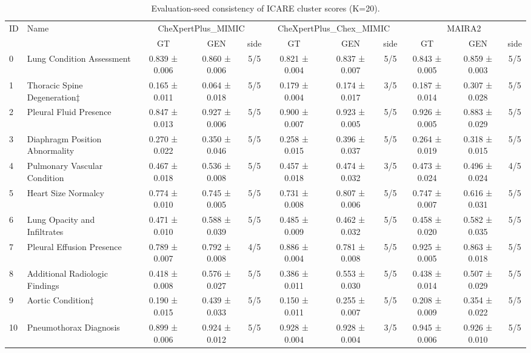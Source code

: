 \begin{table}[t]
\centering
\small
\caption{Evaluation-seed consistency of ICARE cluster scores (K=20).}
\label{tab:supp_exp5}
\begin{tabular}{llccccccccc}
\toprule
ID & Name & \multicolumn{3}{c}{CheXpertPlus\_MIMIC} & \multicolumn{3}{c}{CheXpertPlus\_Chex\_MIMIC} & \multicolumn{3}{c}{MAIRA2} \\
\cmidrule(lr){3-5}\cmidrule(lr){6-8}\cmidrule(lr){9-11}
 & & GT & GEN & side & GT & GEN & side & GT & GEN & side \\
\midrule
0 & Lung Condition Assessment & 0.839 ± 0.006 & 0.860 ± 0.006 & 5/5 & 0.821 ± 0.004 & 0.837 ± 0.007 & 5/5 & 0.843 ± 0.005 & 0.859 ± 0.003 & 5/5 \\
1 & Thoracic Spine Degeneration‡ & 0.165 ± 0.011 & 0.064 ± 0.018 & 5/5 & 0.179 ± 0.004 & 0.174 ± 0.017 & 3/5 & 0.187 ± 0.014 & 0.307 ± 0.028 & 5/5 \\
2 & Pleural Fluid Presence & 0.847 ± 0.013 & 0.927 ± 0.006 & 5/5 & 0.900 ± 0.007 & 0.923 ± 0.005 & 5/5 & 0.926 ± 0.005 & 0.883 ± 0.029 & 5/5 \\
3 & Diaphragm Position Abnormality & 0.270 ± 0.022 & 0.350 ± 0.046 & 5/5 & 0.258 ± 0.015 & 0.396 ± 0.037 & 5/5 & 0.264 ± 0.019 & 0.318 ± 0.015 & 5/5 \\
4 & Pulmonary Vascular Condition & 0.467 ± 0.018 & 0.536 ± 0.008 & 5/5 & 0.457 ± 0.018 & 0.474 ± 0.032 & 3/5 & 0.473 ± 0.024 & 0.496 ± 0.024 & 4/5 \\
5 & Heart Size Normalcy & 0.774 ± 0.010 & 0.745 ± 0.005 & 5/5 & 0.731 ± 0.008 & 0.807 ± 0.006 & 5/5 & 0.747 ± 0.007 & 0.616 ± 0.031 & 5/5 \\
6 & Lung Opacity and Infiltrates & 0.471 ± 0.010 & 0.588 ± 0.039 & 5/5 & 0.485 ± 0.009 & 0.462 ± 0.032 & 5/5 & 0.458 ± 0.020 & 0.582 ± 0.035 & 5/5 \\
7 & Pleural Effusion Presence & 0.789 ± 0.007 & 0.792 ± 0.008 & 4/5 & 0.886 ± 0.004 & 0.781 ± 0.008 & 5/5 & 0.925 ± 0.005 & 0.863 ± 0.018 & 5/5 \\
8 & Additional Radiologic Findings & 0.418 ± 0.008 & 0.576 ± 0.027 & 5/5 & 0.386 ± 0.011 & 0.553 ± 0.030 & 5/5 & 0.438 ± 0.014 & 0.507 ± 0.029 & 5/5 \\
9 & Aortic Condition‡ & 0.190 ± 0.015 & 0.439 ± 0.033 & 5/5 & 0.150 ± 0.011 & 0.255 ± 0.007 & 5/5 & 0.208 ± 0.009 & 0.354 ± 0.022 & 5/5 \\
10 & Pneumothorax Diagnosis & 0.899 ± 0.006 & 0.924 ± 0.012 & 5/5 & 0.928 ± 0.004 & 0.928 ± 0.004 & 3/5 & 0.945 ± 0.006 & 0.926 ± 0.010 & 5/5 \\

\end{tabular}
\end{table}
